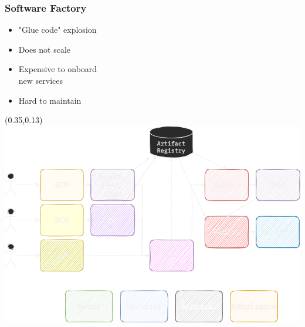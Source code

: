 \documentclass[aspectratio=169,11pt,hyperref={colorlinks=true}]{beamer}
\begin{document}
\begin{blackframe}
  \frametitle{Software Factory}
  \begin{itemize}
    \item "Glue code" explosion
    \item Does not scale
    \item Expensive to onboard \\new services
    \item Hard to maintain
  \end{itemize}
  \begin{textblock*}{0.60\paperwidth}(0.35\paperwidth,0.13\paperheight)
    \includegraphics[width=0.60\paperwidth]{img/cdevents-multiple-components.png}
  \end{textblock*}
\end{blackframe}
\end{document}
